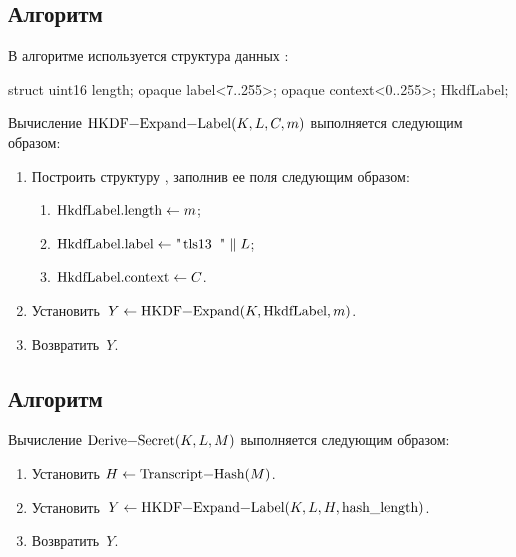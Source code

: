 \subsection{Алгоритм }\label{CRYPTO.HKDF.Label}

В алгоритме  используется структура данных :
\begin{codeblock}
struct {
  uint16 length;
  opaque label<7..255>;
  opaque context<0..255>;
} HkdfLabel;
\end{codeblock}

Вычисление $\code{HKDF-Expand-Label}(K,L,C,m)$ выполняется следующим образом: 

\begin{enumerate}
\item
Построить структуру , заполнив ее поля следующим образом:
\begin{enumerate}
\item
$\code{HkdfLabel.length}\gets m$;
\item
$\code{HkdfLabel.label}\gets \str{tls13 } \parallel L$;
\item
$\code{HkdfLabel.context}\gets C$.
\end{enumerate}
\item
Установить~$Y\gets\code{HKDF-Expand}(K, \code{HkdfLabel}, m)$.
\item
Возвратить~$Y$.
\end{enumerate}

\subsection{Алгоритм }\label{CRYPTO.HKDF.Derive}

Вычисление $\code{Derive-Secret}(K,L,M)$ выполняется следующим образом: 
%
\begin{enumerate}
\item
Установить $H\gets\code{Transcript-Hash}(M)$.
\item
Установить~$Y\gets\code{HKDF-Expand-Label}(K,L,H,\code{hash_length})$.
\item
Возвратить~$Y$.
\end{enumerate}

